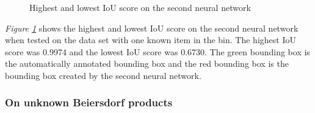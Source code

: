 \begin{figure}[h]
    \centering
    \hspace{0.5cm}
    \caption{Highest and lowest IoU score on the second neural network}
    \label{figure: v2bestworst}
\end{figure}

\textit{Figure \ref{figure: v2bestworst}} shows the highest and lowest IoU score on the second neural network when tested on the data set with one known item in the bin. The highest IoU score was 0.9974 and the lowest IoU score was 0.6730. The green bounding box is the automatically annotated bounding box and the red bounding box is the bounding box created by the second neural network.

\clearpage
\subsubsection{On unknown Beiersdorf products}\label{subsec:v2resunknownprod}

